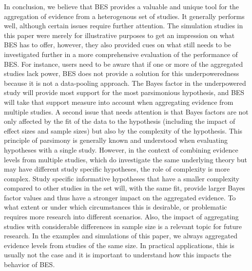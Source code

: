 \documentclass[11pt,reqno]{article}
\begin{document}
In conclusion, we believe that BES provides a valuable and unique tool for the aggregation of evidence from a heterogenous set of studies. It generally performs well, although certain issues require further attention.
The simulation studies in this paper were merely for illustrative purposes to get an impression on what BES has to offer, however, they also provided cues on what still needs to be investigated further in a more comprehensive evaluation of the performance of BES. For instance, users need to be aware that if one or more of the aggregated studies lack power, BES does not provide a solution for this underpoweredness because it is not a data-pooling approach. The Bayes factor in the underpowered study will provide most support for the most parsimonious hypothesis, and BES will take that support measure into account when aggregating evidence from multiple studies. A second issue that needs attention is that Bayes factors are not only affected by the fit of the data to the hypothesis (including the impact of effect sizes and sample sizes) but also by the complexity of the hypothesis. This principle of parsimony is generally known and understood when evaluating hypotheses with a single study. However, in the context of combining evidence levels from multiple studies, which do investigate the same underlying theory but may have different study specific hypotheses, the role of complexity is more complex. Study specific informative hypotheses that have a smaller complexity compared to other studies in the set will, with the same fit, provide larger Bayes factor values and thus have a stronger impact on the aggregated evidence. To what extent or under which circumstances this is desirable, or problematic requires more research into different scenarios. Also, the impact of aggregating studies with considerable differences in sample size is a relevant topic for future research. In the examples and simulations of this paper, we always aggregated evidence levels from studies of the same size. In practical applications, this is usually not the case and it is important to understand how this impacts the behavior of BES.
\end{document}
